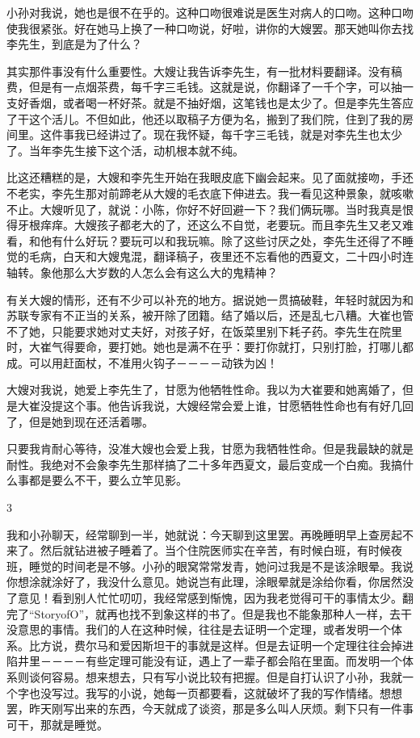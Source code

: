 小孙对我说，她也是很不在乎的。这种口吻很难说是医生对病人的口吻。这种口吻使我很紧张。好在她马上换了一种口吻说，好啦，讲你的大嫂罢。那天她叫你去找李先生，到底是为了什么？ 

其实那件事没有什么重要性。大嫂让我告诉李先生，有一批材料要翻译。没有稿费，但是有一点烟茶费，每千字三毛钱。这就是说，你翻译了一千个字，可以抽一支好香烟，或者喝一杯好茶。就是不抽好烟，这笔钱也是太少了。但是李先生答应了干这个活儿。不但如此，他还以取稿子方便为名，搬到了我们院，住到了我的房间里。这件事我已经讲过了。现在我怀疑，每千字三毛钱，就是对李先生也太少了。当年李先生接下这个活，动机根本就不纯。 

比这还糟糕的是，大嫂和李先生开始在我眼皮底下幽会起来。见了面就接吻，手还不老实，李先生那对前蹄老从大嫂的毛衣底下伸进去。我一看见这种景象，就咳嗽不止。大嫂听见了，就说：小陈，你好不好回避一下？我们俩玩哪。当时我真是恨得牙根痒痒。大嫂孩子都老大的了，还这么不自觉，老要玩。而且李先生又老又难看，和他有什么好玩？要玩可以和我玩嘛。除了这些讨厌之处，李先生还得了不睡觉的毛病，白天和大嫂鬼混，翻译稿子，夜里还不忘看他的西夏文，二十四小时连轴转。象他那么大岁数的人怎么会有这么大的鬼精神？ 

有关大嫂的情形，还有不少可以补充的地方。据说她一贯搞破鞋，年轻时就因为和苏联专家有不正当的关系，被开除了团籍。结了婚以后，还是乱七八糟。大崔也管不了她，只能要求她对丈夫好，对孩子好，在饭菜里别下耗子药。李先生在院里时，大崔气得要命，要打她。她也是满不在乎：要打你就打，只别打脸，打哪儿都成。可以用赶面杖，不准用火钩子－－－－动铁为凶！ 

大嫂对我说，她爱上李先生了，甘愿为他牺牲性命。我以为大崔要和她离婚了，但是大崔没提这个事。他告诉我说，大嫂经常会爱上谁，甘愿牺牲性命也有有好几回了，但是她到现在还活着哪。 

只要我肯耐心等待，没准大嫂也会爱上我，甘愿为我牺牲性命。但是我最缺的就是耐性。我绝对不会象李先生那样搞了二十多年西夏文，最后变成一个白痴。我搞什么事都是要么不干，要么立竿见影。 

3 

我和小孙聊天，经常聊到一半，她就说：今天聊到这里罢。再晚睡明早上查房起不来了。然后就钻进被子睡着了。当个住院医师实在辛苦，有时候白班，有时候夜班，睡觉的时间老是不够。小孙的眼窝常常发青，她问过我是不是该涂眼晕。我说你想涂就涂好了，我没什么意见。她说岂有此理，涂眼晕就是涂给你看，你居然没了意见！看到别人忙忙叨叨，我经常感到惭愧，因为我老觉得可干的事情太少。翻完了“StoryofO”，就再也找不到象这样的书了。但是我也不能象那种人一样，去干没意思的事情。我们的人在这种时候，往往是去证明一个定理，或者发明一个体系。比方说，费尔马和爱因斯坦干的事就是这样。但是去证明一个定理往往会掉进陷井里－－－－有些定理可能没有证，遇上了一辈子都会陷在里面。而发明一个体系则谈何容易。想来想去，只有写小说比较有把握。但是自打认识了小孙，我就一个字也没写过。我写的小说，她每一页都要看，这就破坏了我的写作情绪。想想罢，昨天刚写出来的东西，今天就成了谈资，那是多么叫人厌烦。剩下只有一件事可干，那就是睡觉。 

